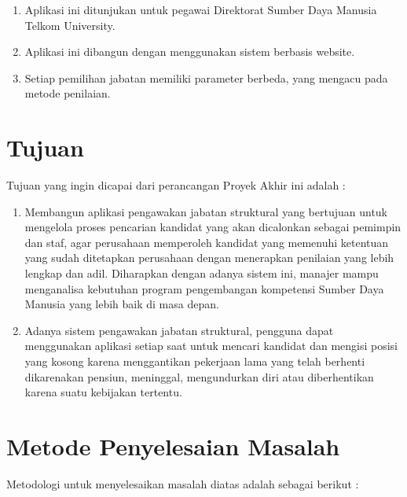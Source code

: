\begin{enumerate}
	\item Aplikasi ini ditunjukan untuk pegawai Direktorat Sumber Daya Manusia Telkom University.
	\item Aplikasi ini dibangun dengan menggunakan sistem berbasis website.
	\item Setiap pemilihan jabatan memiliki parameter berbeda, yang mengacu pada metode penilaian.
\end{enumerate}

\section{Tujuan}
Tujuan yang ingin dicapai dari perancangan Proyek Akhir ini adalah :

\begin{enumerate}
	\item Membangun aplikasi pengawakan jabatan struktural yang bertujuan untuk mengelola proses pencarian kandidat yang akan dicalonkan sebagai pemimpin dan staf, agar perusahaan memperoleh kandidat yang memenuhi ketentuan yang sudah ditetapkan perusahaan dengan menerapkan penilaian yang lebih lengkap dan adil. Diharapkan dengan adanya sistem ini, manajer mampu menganalisa kebutuhan program pengembangan kompetensi Sumber Daya Manusia yang lebih baik di masa depan.
	\item Adanya sistem pengawakan jabatan struktural, pengguna dapat menggunakan aplikasi setiap saat untuk mencari kandidat dan mengisi posisi yang kosong karena menggantikan pekerjaan lama yang telah berhenti dikarenakan pensiun, meninggal, mengundurkan diri atau diberhentikan karena suatu kebijakan tertentu.
\end{enumerate}

\section{Metode Penyelesaian Masalah}
Metodologi untuk menyelesaikan masalah diatas adalah sebagai berikut :

